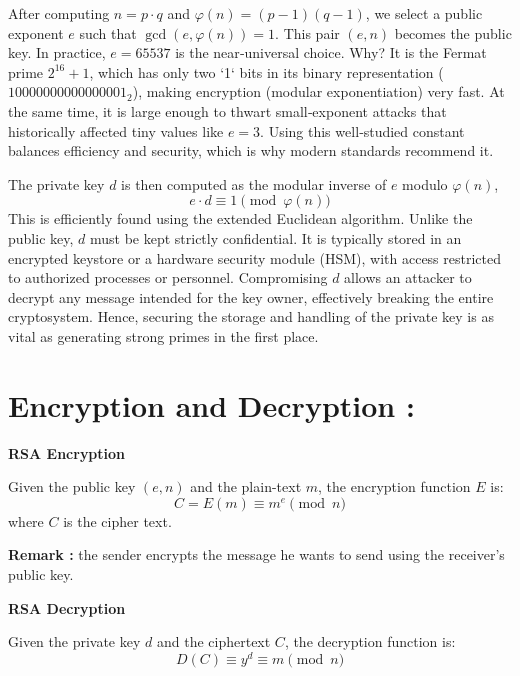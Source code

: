 After computing $n = p \cdot q$ and $\varphi(n) = (p-1)(q-1)$, we select a public exponent $e$ such that $\gcd(e, \varphi(n)) = 1$. This pair $(e, n)$ becomes the public key. In practice, $e = 65537$ is the near‑universal choice. Why? It is the Fermat prime $2^{16} + 1$, which has only two `1` bits in its binary representation ($10000000000000001_2$), making encryption (modular exponentiation) very fast. At the same time, it is large enough to thwart small‑exponent attacks that historically affected tiny values like $e = 3$. Using this well‑studied constant balances efficiency and security, which is why modern standards recommend it.

The private key $d$ is then computed as the modular inverse of $e$ modulo $\varphi(n)$, 
\[
e \cdot d \equiv 1 \pmod{\varphi(n)}
\]
 This is efficiently found using the extended Euclidean algorithm. Unlike the public key, $d$ must be kept strictly confidential. It is typically stored in an encrypted keystore or a hardware security module (HSM), with access restricted to authorized processes or personnel. Compromising $d$ allows an attacker to decrypt any message intended for the key owner, effectively breaking the entire cryptosystem. Hence, securing the storage and handling of the private key is as vital as generating strong primes in the first place.



\section{Encryption and Decryption :}

\textbf{RSA Encryption}

Given the public key \( (e,n)  \) and the plain-text \( m \), the encryption function $E$ is:
\[
C = E(m) \equiv m^e \pmod{n}
\]
where $C$ is the cipher text.

\textbf{Remark :}
the sender encrypts the message he wants to send using the receiver's public key.


\textbf{RSA Decryption}

Given the private key \( d  \) and the ciphertext \( C \), the decryption function is:
\[
 D(C) \equiv y^d \equiv m \pmod{n}
\]



